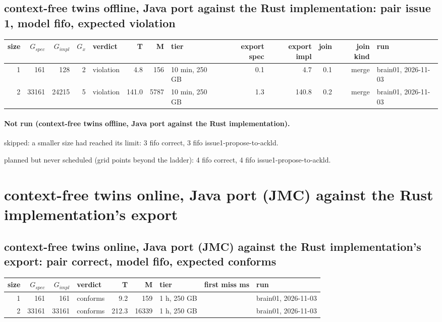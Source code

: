 \documentclass[10pt]{article}
\begin{document}
\subsection*{context-free twins offline, Java port against the Rust implementation: pair \textsf{issue 1}, model fifo, expected violation}
\begin{longtable}{@{}rrrrlrrlrrrrl@{}}
\toprule
size & $G_{\mathit{spec}}$ & $G_{\mathit{impl}}$ & $G_x$ & verdict & T & M & tier & export spec & export impl & join & join kind & run \\
\midrule
\endhead
\color{blue} 1 & 161 & 128 & 2 & violation & 4.8 & 156 & 10 min, 250 GB & 0.1 & 4.7 & 0.1 & merge & brain01, 2026-11-03 \\
\color{blue} 2 & 33161 & 24215 & 5 & violation & 141.0 & 5787 & 10 min, 250 GB & 1.3 & 140.8 & 0.2 & merge & brain01, 2026-11-03 \\
\bottomrule
\end{longtable}
\paragraph{Not run (context-free twins offline, Java port against the Rust implementation).}
skipped: a smaller size had reached its limit: 3 fifo correct, 3 fifo issue1-propose-to-ackld.\par
planned but never scheduled (grid points beyond the ladder): 4 fifo correct, 4 fifo issue1-propose-to-ackld.\par
\section*{context-free twins online, Java port (JMC) against the Rust implementation's export}
\subsection*{context-free twins online, Java port (JMC) against the Rust implementation's export: pair \textsf{correct}, model fifo, expected conforms}
\begin{longtable}{@{}rrrlrrlrl@{}}
\toprule
size & $G_{\mathit{spec}}$ & $G_{\mathit{impl}}$ & verdict & T & M & tier & first miss ms & run \\
\midrule
\endhead
\color{blue} 1 & 161 & 161 & conforms & 9.2 & 159 & 1 h, 250 GB &  & brain01, 2026-11-03 \\
\color{blue} 2 & 33161 & 33161 & conforms & 212.3 & 16339 & 1 h, 250 GB &  & brain01, 2026-11-03 \\
\bottomrule
\end{longtable}
\end{document}
